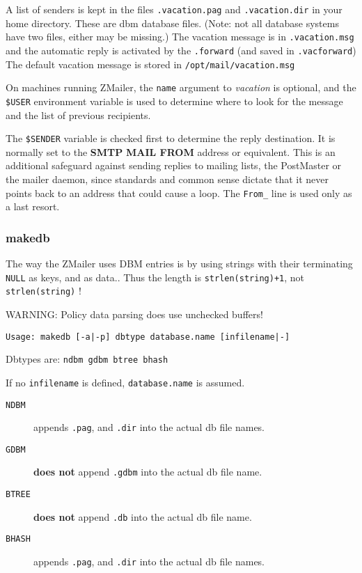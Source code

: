 A list of senders is kept in the files {\tt .vacation.pag} and 
{\tt .vacation.dir} in your home directory. These are dbm database 
files. (Note: not all database systems have two files, either may be 
missing.) The vacation message is in {\tt .vacation.msg} and 
the automatic reply is activated by the {\tt .forward} (and 
saved in {\tt .vacforward}) The default vacation message is 
stored in {\tt /opt/mail/vacation.msg}

On machines running ZMailer, the {\tt name} argument 
to {\em vacation\/} is optional, and the {\tt \$USER} 
environment variable is used to determine where to look for the 
message and the list of previous recipients.

The {\tt \$SENDER} variable is checked first to determine 
the reply destination. It is normally set to the {\bf SMTP} 
{\bf MAIL FROM} address or equivalent. This is an additional 
safeguard against sending replies to mailing lists, the PostMaster 
or the mailer daemon, since standards and common sense dictate that 
it never points back to an address that could cause a loop. The 
{\tt From\_} line is used only as a last resort.




\subsubsection{makedb}



The way the ZMailer uses DBM entries is by using strings with 
their terminating {\tt NULL} as keys, and as data.. Thus 
the length is {\tt strlen(string)+1}, not {\tt strlen(string)} !

WARNING: Policy data parsing does use unchecked buffers!

\begin{tscreen}
\begin{verbatim}
Usage: makedb [-a|-p] dbtype database.name [infilename|-]
\end{verbatim}
\end{tscreen}


Dbtypes are: {\tt ndbm gdbm btree bhash}

If no {\tt infilename} is defined, {\tt database.name} is assumed.

\begin{description}
\item[{\tt NDBM}] \mbox{}

appends {\tt .pag}, and {\tt .dir}
into the actual db file names.

\item[{\tt GDBM}] \mbox{}

{\bf does not} append {\tt .gdbm}
into the actual db file name.

\item[{\tt BTREE}] \mbox{}

{\bf does not} append {\tt .db}
into the actual db file name.

\item[{\tt BHASH}] \mbox{}

appends {\tt .pag}, and {\tt .dir}
into the actual db file names.

\end{description}


